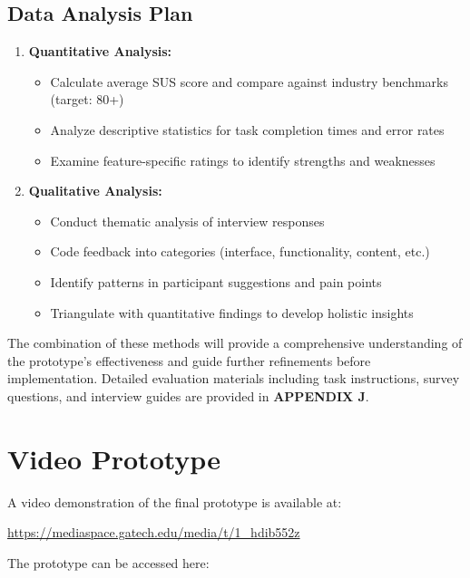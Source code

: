 \documentclass[
	letterpaper, %
]{jdf}
\begin{document}
\begin{sloppypar}
\subsection{Data Analysis Plan}

\begin{enumerate}
    \item \textbf{Quantitative Analysis:}
    \begin{itemize}
        \item Calculate average SUS score and compare against industry benchmarks (target: 80+)
        \item Analyze descriptive statistics for task completion times and error rates
        \item Examine feature-specific ratings to identify strengths and weaknesses
    \end{itemize}

    \item \textbf{Qualitative Analysis:}
    \begin{itemize}
        \item Conduct thematic analysis of interview responses
        \item Code feedback into categories (interface, functionality, content, etc.)
        \item Identify patterns in participant suggestions and pain points
        \item Triangulate with quantitative findings to develop holistic insights
    \end{itemize}
\end{enumerate}

The combination of these methods will provide a comprehensive understanding of the prototype's effectiveness and guide further refinements before implementation. Detailed evaluation materials including task instructions, survey questions, and interview guides are provided in \textbf{APPENDIX J}.

\newpage

\section{Video Prototype}
A video demonstration of the final prototype is available at:

\begin{center}
    \url{https://mediaspace.gatech.edu/media/t/1_hdib552z}
\end{center}

The prototype can be accessed here:


\end{sloppypar}
\end{document}
